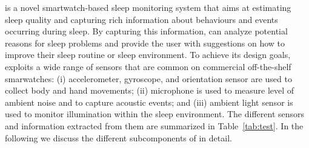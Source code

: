 

\systemname is a novel smartwatch-based sleep monitoring system that aims at estimating sleep quality and capturing rich information about
behaviours and events occurring during sleep. By capturing this information, \systemname can analyze potential reasons for sleep problems
and provide the user with suggestions on how to improve their sleep routine or sleep environment. To achieve its design goals, \systemname
exploits a wide range of sensors that are common on commercial off-the-shelf smarwatches: (i) accelerometer, gyroscope, and orientation
sensor are used to collect body and hand movements; (ii) microphone is used to measure level of ambient noise and to capture acoustic
events; and (iii) ambient light sensor is used to monitor illumination within the sleep environment. The different sensors and information
extracted from them are summarized in Table~\ref{tab:test}. In the following we discuss the different subcomponents of \systemname in
detail. 


